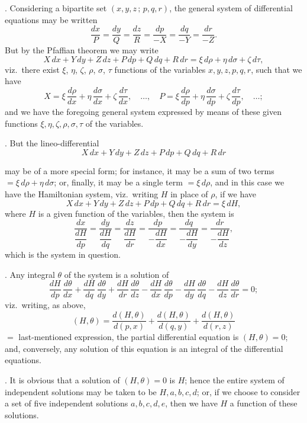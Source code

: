 \documentclass[11pt,a4paper]{article}
\begin{document}
. Considering a bipartite set $(x, y, z\,;\, p, q, r)$, the general system of differential equations may be written
\[
\frac{dx}{P} = \frac{dy}{Q} = \frac{dz}{R} = \frac{dp}{-X} = \frac{dq}{-Y} = \frac{dr}{-Z}.
\]
But by the Pfaffian theorem we may write
\[
X\,dx + Y\,dy + Z\,dz + P\,dp + Q\,dq + R\,dr = \xi\,d\rho + \eta\,d\sigma + \zeta\,d\tau,
\]
viz.\ there exist $\xi$, $\eta$, $\zeta$, $\rho$, $\sigma$, $\tau$ functions of the variables $x, y, z, p, q, r$, such that we have
\[
X = \xi\,\frac{d\rho}{dx} + \eta\,\frac{d\sigma}{dx} + \zeta\,\frac{d\tau}{dx}, \quad \ldots, \quad P = \xi\,\frac{d\rho}{dp} + \eta\,\frac{d\sigma}{dp} + \zeta\,\frac{d\tau}{dp}, \quad \ldots;
\]
and we have the foregoing general system expressed by means of these given functions $\xi, \eta, \zeta, \rho, \sigma, \tau$ of the variables.

\medskip

. But the lineo-differential
\[
X\,dx + Y\,dy + Z\,dz + P\,dp + Q\,dq + R\,dr
\]

\newpage


may be of a more special form; for instance, it may be a sum of two terms $= \xi\,d\rho + \eta\,d\sigma$; or, finally, it may be a single term $= \xi\,d\rho$, and in this case we have the Hamiltonian system, viz.\ writing $H$ in place of $\rho$, if we have
\[
X\,dx + Y\,dy + Z\,dz + P\,dp + Q\,dq + R\,dr = \xi\,dH,
\]
where $H$ is a given function of the variables, then the system is
\[
\frac{dx}{\dfrac{dH}{dp}} = \frac{dy}{\dfrac{dH}{dq}} = \frac{dz}{\dfrac{dH}{dr}} = \frac{dp}{-\dfrac{dH}{dx}} = \frac{dq}{-\dfrac{dH}{dy}} = \frac{dr}{-\dfrac{dH}{dz}},
\]
which is the system in question.

\medskip

. Any integral $\theta$ of the system is a solution of
\[
\frac{dH}{dp}\,\frac{d\theta}{dx} + \frac{dH}{dq}\,\frac{d\theta}{dy} + \frac{dH}{dr}\,\frac{d\theta}{dz} - \frac{dH}{dx}\,\frac{d\theta}{dp} - \frac{dH}{dy}\,\frac{d\theta}{dq} - \frac{dH}{dz}\,\frac{d\theta}{dr} = 0;
\]
viz.\ writing, as above,
\[
(H, \theta) = \frac{d(H, \theta)}{d(p, x)} + \frac{d(H, \theta)}{d(q, y)} + \frac{d(H, \theta)}{d(r, z)}
\]
$= $ last-mentioned expression,
the partial differential equation is $(H, \theta) = 0$; and, conversely, any solution of this equation is an integral of the differential equations.

\medskip

. It is obvious that a solution of $(H, \theta) = 0$ is $H$; hence the entire system of independent solutions may be taken to be $H, a, b, c, d$; or, if we choose to consider a set of five independent solutions $a, b, c, d, e$, then we have $H$ a function of these solutions.
\end{document}

